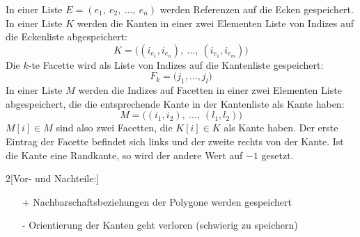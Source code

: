 \begin{Definition}[Kantenliste]

In einer Liste $E = (e_1,~e_2,~\hdots,~e_n)$ werden Referenzen auf die Ecken 
gespeichert. 
In einer Liste $K$ werden die Kanten  in einer zwei Elementen Liste von Indizes auf die Eckenliste 
abgespeichert: 
\begin{equation*}
    K = \bigl( (i_{e_1},i_{e_n}),~\hdots,~
               (i_{e_1},i_{e_m}) \bigr)
\end{equation*}
Die $k$-te Facette wird als Liste von Indizes auf die Kantenliste 
gespeichert: 
\begin{equation*}
    F_k = \bigl( j_1,\hdots,j_l \bigr)
\end{equation*}
In einer Liste $M$ werden die Indizes auf Facetten in einer zwei Elementen Liste abgespeichert, 
die die entsprechende Kante in der Kantenliste als Kante haben: 
\begin{equation*}
    M = \bigl( (i_1,i_2),~\hdots,~(l_1,l_2) \bigr )
\end{equation*}
$M[i] \in M$ sind also zwei Facetten, die $K[i] \in K$ als Kante haben. 
Der erste Eintrag der Facette befindet sich links und der zweite rechts von der 
Kante. 
Ist die Kante eine Randkante, so wird der andere Wert auf $-1$ 
gesetzt. 



\end{Definition}
\begin{multicols}{2}[Vor- und Nachteile:]
    \begin{itemize}
        \item[+] Nachbarschaftsbeziehungen der Polygone werden gespeichert 
        \item[-] Orientierung der Kanten geht verloren (schwierig zu speichern) 
    \end{itemize}
\end{multicols}

